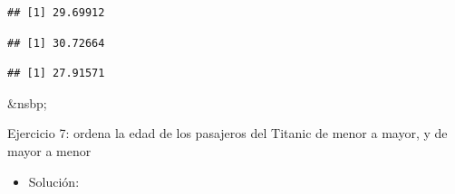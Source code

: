 \documentclass[11pt,]{book}
\newenvironment{Shaded}{\begin{snugshade}}{\end{snugshade}}
\newcommand{\CommentTok}[1]{\textcolor[rgb]{0.37,0.37,0.37}{\textit{#1}}}
\newcommand{\DataTypeTok}[1]{\textcolor[rgb]{0.27,0.27,0.27}{#1}}
\newcommand{\KeywordTok}[1]{\textcolor[rgb]{0.27,0.27,0.27}{\textbf{#1}}}
\newcommand{\NormalTok}[1]{#1}
\newcommand{\OperatorTok}[1]{\textcolor[rgb]{0.43,0.43,0.43}{\textbf{#1}}}
\newcommand{\OtherTok}[1]{\textcolor[rgb]{0.37,0.37,0.37}{#1}}
\newcommand{\StringTok}[1]{\textcolor[rgb]{0.5,0.5,0.5}{#1}}
\providecommand{\tightlist}{%
  \setlength{\itemsep}{0pt}\setlength{\parskip}{0pt}}
\begin{document}
\begin{verbatim}
## [1] 29.69912
\end{verbatim}

\begin{Shaded}
\end{Shaded}

\begin{verbatim}
## [1] 30.72664
\end{verbatim}

\begin{Shaded}
\end{Shaded}

\begin{verbatim}
## [1] 27.91571
\end{verbatim}

\&nsbp;

Ejercicio 7: ordena la edad de los pasajeros del Titanic de menor a mayor, y de mayor a menor

\begin{itemize}
\tightlist
\item
  Solución:
\end{itemize}

\begin{Shaded}
\end{Shaded}
\end{document}
